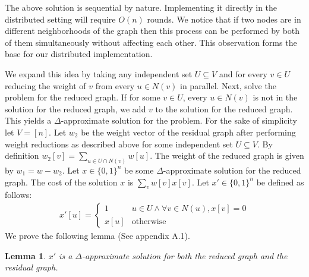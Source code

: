 \documentclass[11pt]{article}
\newtheorem{lemma}[theorem]{Lemma}
\begin{document}
The above solution is sequential by nature. Implementing it directly in the distributed setting will require $O(n)$ rounds. We notice that if two nodes are in different neighborhoods of the graph then this process can be performed by both of them simultaneously without affecting each other. This observation forms the base for our distributed implementation.

We expand this idea by taking any independent set $U \subseteq V$ and for every $v \in U$ reducing the weight of $v$ from every $u \in N(v)$ in parallel. Next, solve the problem for the reduced graph. If for some $v \in U$, every $u\in N(v)$ is not in the solution for the reduced graph, we add $v$ to the solution for the reduced graph. This yields a $\Delta$-approximate solution for the problem.
For the sake of simplicity let $V=[n]$. Let $w_2$ be the weight vector of the residual graph after performing weight reductions as described above for some independent set $U \subseteq V$. By definition $w_2[v] = \sum_{u \in U \cap N(v)} w[u]$. The weight of the reduced graph is given by $w_1 = w - w_2$. Let $x \in \{0,1\}^n$ be some $\Delta$-approximate solution for the reduced graph. The cost of the solution $x$ is $\sum_{v}w[v]x[v]$. Let $x'\in \{0,1\}^n$ be defined as follows:
\begin{align}
	x'[u] =
	\begin{cases}
	1 & u\in U \wedge \forall v\in N(u), x[v]=0 \\
	x[u] & \text{otherwise}
	\end{cases}
\end{align}
 We prove the following lemma (See appendix A.1).
\begin{lemma}
	\label{lem:ind-set-lr}
	$x'$ is a $\Delta$-approximate solution for both the reduced graph and the residual graph.
\end{lemma}
%	
\end{document}
